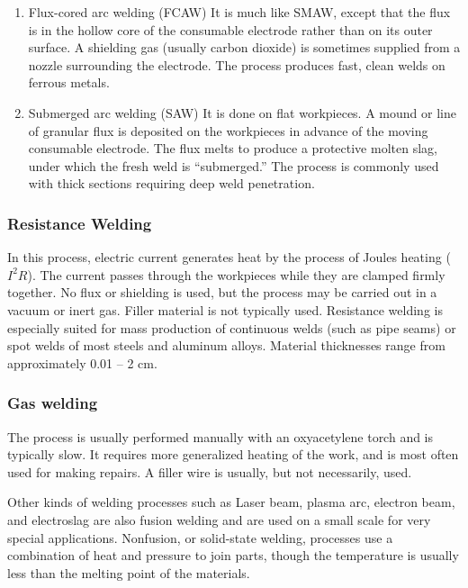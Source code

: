 \documentclass[a4paper,openany,nobib]{tufte-book}
\begin{document}
{{\begin{enumerate}
3.0 Unported
\url{pictures/Welding/gas-tungsten-arc-welding}

\item Flux-cored arc welding (FCAW)
\label{flux-cored-arc-welding-fcaw}
It is much like SMAW, except that the flux is in the hollow core of the
consumable electrode rather than on its outer surface. A shielding gas
(usually carbon dioxide) is sometimes supplied from a nozzle surrounding
the electrode. The process produces fast, clean welds on ferrous metals.

\item Submerged arc welding (SAW)
\label{submerged-arc-welding-saw}
It is done on flat workpieces. A mound or line of granular flux is
deposited on the workpieces in advance of the moving consumable
electrode. The flux melts to produce a protective molten slag, under
which the fresh weld is ``submerged.'' The process is commonly used with
thick sections requiring deep weld penetration.
\end{enumerate}

\subsubsection{Resistance Welding}
\label{resistance-welding}
In this process, electric current generates heat by the process of
Joules heating (\(I^2R\)). The current passes through the workpieces while
they are clamped firmly together. No flux or shielding is used, but the
process may be carried out in a vacuum or inert gas. Filler material is
not typically used. Resistance welding is especially suited for mass
production of continuous welds (such as pipe seams) or spot welds of
most steels and aluminum alloys. Material thicknesses range from
approximately 0.01 -- 2 cm.

\subsubsection{Gas welding}
\label{gas-welding}
The process is usually performed manually with an oxyacetylene torch and
is typically slow. It requires more generalized heating of the work, and
is most often used for making repairs. A filler wire is usually, but not
necessarily, used.

Other kinds of welding processes such as Laser beam, plasma arc,
electron beam, and electroslag are also fusion welding and are used on a
small scale for very special applications. Nonfusion, or solid-state
welding, processes use a combination of heat and pressure to join parts,
though the temperature is usually less than the melting point of the
materials.

}}
\end{document}
